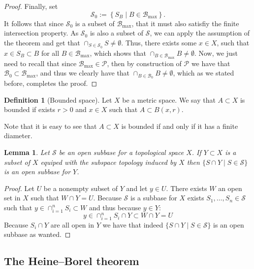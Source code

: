 \documentclass[11pt,a4paper]{article}
\theoremstyle{definition}
\newtheorem{definition}{Definition}[section]
\theoremstyle{plain}
\newtheorem{lemma}[theorem]{Lemma}
\newcommand{\set}[2]{ \left\{ #1 \mid #2 \right\} }
\begin{document}
\begin{proof}
    Finally, set
    \[
      \mathcal S_0 := \set{S_B}{B \in \mathcal B_{\max}}.
    \]
    It follows that since $\mathcal S_0$ is a subset of $\mathcal B_{\max}$, 
    that it must also satisfiy the finite intersection property.
    As $\mathcal S_0$ is also a subset of $\mathcal S$,
    we can apply the assumption of the theorem and get that
    $\cap_{S \in \mathcal S_0} S \neq \emptyset$.
    Thus, there exists some $x \in X$, such that $x \in S_B \subset B$
    for all $B \in \mathcal B_{\max}$, which shows that
    $\cap_{B \in \mathcal B_{\max}} B \neq \emptyset$.
    Now, we just need to recall that since $\mathcal B_{\max} \in \mathcal P$,
    then by construction of $\mathcal P$ we have that 
    $\mathcal B_0 \subset \mathcal B_{\max}$, and thus we clearly have that
    $\cap_{B \in \mathcal B_0} B \neq \emptyset$, which as we stated before,
    completes the proof.
  \end{proof}
  
  \begin{definition}[Bounded space]
    Let $X$ be a metric space. We say that $A \subset X$ is 
    bounded if exists $r > 0$ and $x \in X$ such that $A \subset B(x,r)$.
  \end{definition}

  Note that it is easy to see that $A \subset X$ is bounded if and only
  if it has a finite diameter.
  
  \begin{lemma}
    Let $\mathcal{S}$ be an open subbase for a topological space $X$.
    If $Y \subset X$ is a subset of $X$ equiped with the subspace
    topology induced by $X$ then $\{S \cap Y \mid S \in \mathcal{S}\}$
    is an open subbase for $Y$.
  \end{lemma}
  \begin{proof}
    Let $U$ be a nonempty subset of $Y$ and let $y \in U$. There
    exists $W$ an open set in $X$ such that $W \cap Y = U$. Because
    $\mathcal{S}$ is a subbase for $X$ exists 
    $S_1,\dots,S_n \in \mathcal{S}$ such that 
    $y \in \cap_{i=1}^{n}{S_i} \subset W$ and thus because $y \in Y$:
    \[
      y \in \cap_{i=1}^{n}{S_i \cap Y} \subset W \cap Y = U
    \]
    Because $S_i \cap Y$ are all open in $Y$ we have that indeed
    $\{S \cap Y \mid S \in \mathcal{S}\}$ is an open subbase as wanted.
  \end{proof}

  \subsection{The Heine--Borel theorem}
\end{document}
